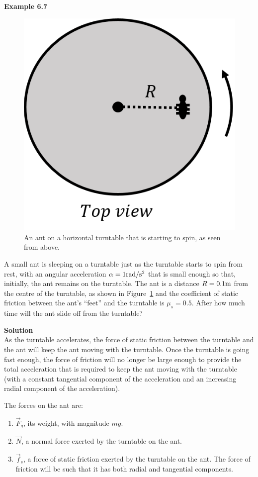 \begin{framed}
\textbf{Example 6.7}\\
\begin{figure}[!htbp]
\centering
\includegraphics[width=0.25\linewidth]{files/ant-84c9202e5ee7cd9f6a0b3c1225f898dd.png}
\caption[]{An ant on a horizontal turntable that is starting to spin, as seen from above.}
\label{fig:applyingnewtonslaws:ant}
\end{figure}

A small ant is sleeping on a turntable just as the turntable starts to spin from rest, with an angular acceleration $\alpha=1 {\rm rad/s^2}$ that is small enough so that, initially, the ant remains on the turntable. The ant is a distance $R=0.1 {\rm m}$ from the centre of the turntable, as shown in Figure~\ref{fig:applyingnewtonslaws:ant}  and the coefficient of static friction between the ant's ``feet'' and the turntable is $\mu_s=0.5$. After how much time will the ant slide off from the turntable?

\begin{framed}
\textbf{Solution}\\
As the turntable accelerates, the force of static friction between the turntable and the ant will keep the ant moving with the turntable. Once the turntable is going fast enough, the force of friction will no longer be large enough to provide the total acceleration that is required to keep the ant moving with the turntable (with a constant tangential component of the acceleration and an increasing radial component of the acceleration).

The forces on the ant are:

\begin{enumerate}
\item $\vec F_g$, its weight, with magnitude $mg$.
\item $\vec N$, a normal force exerted by the turntable on the ant.
\item $\vec f_s$, a force of static friction exerted by the turntable on the ant. The force of friction will be such that it has both radial and tangential components.
\end{enumerate}


\end{framed}
\end{framed}
